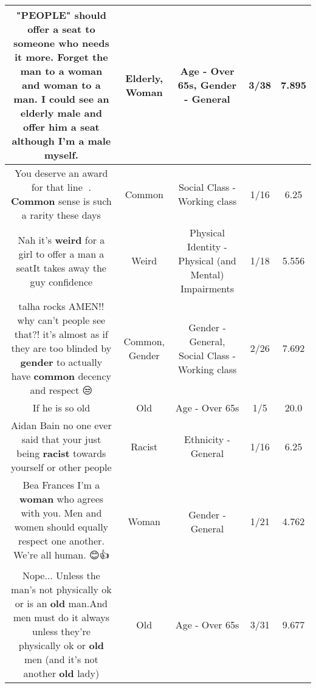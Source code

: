 \documentclass[11pt]{article}
\newlength\mylength
\begin{document}
\begin{center}
\begin{longtable}{|C{.65\mylength}|C{.30\mylength}|C{.12\mylength}|C{.12\mylength}|C{.12\mylength}|}
  \small "PEOPLE" should offer a seat to someone who needs it more. Forget the man to a \textbf{woman} and \textbf{woman} to a man. I could see an \textbf{elderly} male and offer him a seat although I'm a male myself.\normalsize   & Elderly, Woman & Age - Over 65s, Gender - General & 3/38 & 7.895 \\  \hline
  \small You deserve an award for that line 👏. \textbf{Common} sense is such a rarity these days\normalsize   & Common & Social Class - Working class & 1/16 & 6.25 \\  \hline
  \small Nah it's \textbf{weird} for a girl to offer a man a seatIt takes away the guy confidence\normalsize   & Weird & Physical Identity - Physical (and Mental) Impairments & 1/18 & 5.556 \\  \hline
  \small talha rocks AMEN!! why can't people see that?! it's almost as if they are too blinded by \textbf{gender} to actually have \textbf{common} decency and respect 😒\normalsize   & Common, Gender & Gender - General, Social Class - Working class & 2/26 & 7.692 \\  \hline
  \small If he is so old\normalsize   & Old & Age - Over 65s & 1/5 & 20.0 \\  \hline
  \small Aidan Bain no one ever said that your just being \textbf{racist} towards yourself or other people\normalsize   & Racist & Ethnicity - General & 1/16 & 6.25 \\  \hline
  \small Bea Frances I'm a \textbf{woman} who agrees with you. Men and women should equally respect one another. We're all human. 😊👍\normalsize   & Woman & Gender - General & 1/21 & 4.762 \\  \hline
  \small Nope... Unless the man's not physically ok or is an \textbf{old} man.And men must do it always unless they're physically ok or \textbf{old} men (and it's not another \textbf{old} lady)\normalsize   & Old & Age - Over 65s & 3/31 & 9.677 \\  \hline

\end{longtable}
\end{center}
\end{document}
